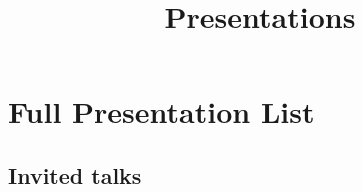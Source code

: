 \documentclass[11pt,letterpaper,sans,unicode]{moderncv}
\title{\huge{Presentations}}
\begin{document}
\makecvtitle

\vspace{-13mm}

\section{Full Presentation List}
\subsection{Invited talks} %
\renewcommand\labelenumi{\bfseries\theenumi .}
\end{document}
